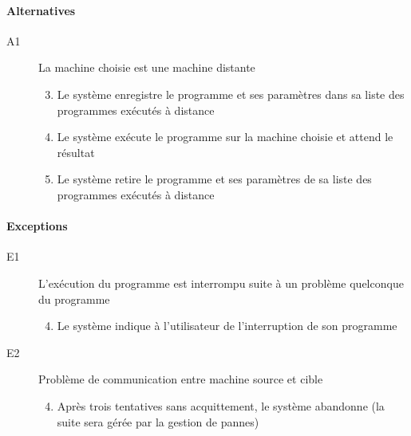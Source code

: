     \paragraph{Alternatives}
      \begin{description}
        \item[A1] La machine choisie est une machine distante
          \begin{enumerate}
            \setcounter{enumi}{2}
            \item Le système enregistre le programme et ses paramètres dans
                   sa liste des programmes exécutés à distance
            \item Le système exécute le programme sur la machine choisie et
                   attend le résultat
            \item Le système retire le programme et ses paramètres de sa
                   liste des programmes exécutés à distance
          \end{enumerate}


      \end{description}

   \paragraph{Exceptions}
     \begin{description}
       \item[E1] L'exécution du programme est interrompu suite à un
         problème quelconque du programme
         \begin{enumerate}
           \setcounter{enumi}{3}
           \item Le système indique à l'utilisateur de l'interruption
             de son programme
         \end{enumerate}

       \item[E2] Problème de communication entre machine source et cible
         \begin{enumerate}
           \setcounter{enumi}{3}
           \item Après trois tentatives sans acquittement, le système
             abandonne (la suite sera gérée par la gestion de pannes)
          \end{enumerate}
     \end{description}

